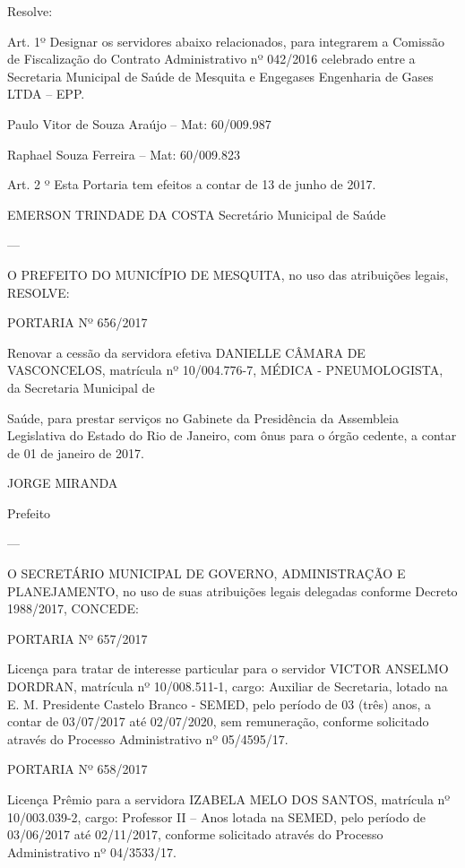 \documentclass{doliberto}
\begin{document}
Resolve: 
 
Art.  1º  Designar  os  servidores  abaixo  relacionados,  para 
integrarem  a  Comissão  de  Fiscalização  do  Contrato 
Administrativo  nº  042/2016  celebrado  entre  a  Secretaria 
Municipal de Saúde de Mesquita e Engegases Engenharia de 
Gases LTDA – EPP. 
 
Paulo Vitor de Souza Araújo – Mat: 60/009.987 
 
Raphael Souza Ferreira – Mat: 60/009.823 
 
Art. 2 º Esta Portaria tem efeitos a contar de 13 de junho de 
2017. 
 

EMERSON TRINDADE DA COSTA 
Secretário Municipal de Saúde 


---

O PREFEITO DO MUNICÍPIO DE MESQUITA, no 
uso das atribuições legais,  
RESOLVE: 
 
PORTARIA Nº 656/2017 
 
Renovar  a  cessão  da  servidora  efetiva  DANIELLE 
CÂMARA  DE  VASCONCELOS,  matrícula  nº  10/004.776-7, 
MÉDICA  -  PNEUMOLOGISTA,  da  Secretaria  Municipal  de 


Saúde, para prestar serviços no Gabinete da Presidência da 
Assembleia  Legislativa  do  Estado  do  Rio  de  Janeiro,  com 
ônus  para  o  órgão  cedente,  a  contar de 01 de janeiro de 
2017. 
 

JORGE MIRANDA 

Prefeito 

---

O  SECRETÁRIO  MUNICIPAL  DE  GOVERNO, 
ADMINISTRAÇÃO E PLANEJAMENTO, no uso de 
suas  atribuições 
legais  delegadas  conforme 
Decreto 1988/2017,  
CONCEDE: 
 
PORTARIA Nº 657/2017 
 
Licença  para  tratar  de  interesse  particular  para  o  servidor 
VICTOR ANSELMO DORDRAN, matrícula nº 10/008.511-1, 
cargo:  Auxiliar  de  Secretaria,  lotado  na  E.  M.  Presidente 
Castelo  Branco  -  SEMED,  pelo  período  de  03  (três)  anos,  a 
contar de 03/07/2017 até 02/07/2020, sem remuneração, 
conforme solicitado através do Processo Administrativo nº 
05/4595/17. 
 
PORTARIA Nº 658/2017 
 
Licença  Prêmio  para  a  servidora  IZABELA  MELO  DOS 
SANTOS,  matrícula  nº  10/003.039-2,  cargo:  Professor  II  – 
Anos 
lotada  na  SEMED,  pelo  período  de 
03/06/2017  até  02/11/2017,  conforme  solicitado  através 
do Processo Administrativo nº 04/3533/17. 
 
\end{document}
